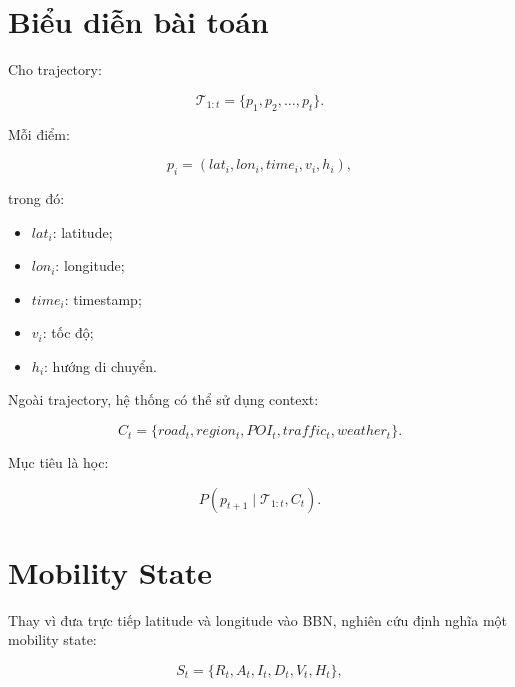 \documentclass[11pt,a4paper]{article}
\begin{document}
	\section{Biểu diễn bài toán}
	
	Cho trajectory:
	
	\begin{equation}
		\mathcal{T}_{1:t}
		=
		\{p_1,p_2,\ldots,p_t\}.
	\end{equation}
	
	Mỗi điểm:
	
	\begin{equation}
		p_i
		=
		(
		lat_i,
		lon_i,
		time_i,
		v_i,
		h_i
		),
	\end{equation}
	
	trong đó:
	
	\begin{itemize}
		\item $lat_i$: latitude;
		\item $lon_i$: longitude;
		\item $time_i$: timestamp;
		\item $v_i$: tốc độ;
		\item $h_i$: hướng di chuyển.
	\end{itemize}
	
	Ngoài trajectory, hệ thống có thể sử dụng context:
	
	\begin{equation}
		C_t
		=
		\{
		road_t,
		region_t,
		POI_t,
		traffic_t,
		weather_t
		\}.
	\end{equation}
	
	Mục tiêu là học:
	
	\begin{equation}
		P
		\left(
		p_{t+1}
		\mid
		\mathcal{T}_{1:t},
		C_t
		\right).
	\end{equation}
	
	\section{Mobility State}
	
	Thay vì đưa trực tiếp latitude và longitude vào BBN, nghiên cứu định
	nghĩa một mobility state:
	
	\begin{equation}
		S_t
		=
		\{
		R_t,
		A_t,
		I_t,
		D_t,
		V_t,
		H_t
		\},
	\end{equation}
	
\end{document}
